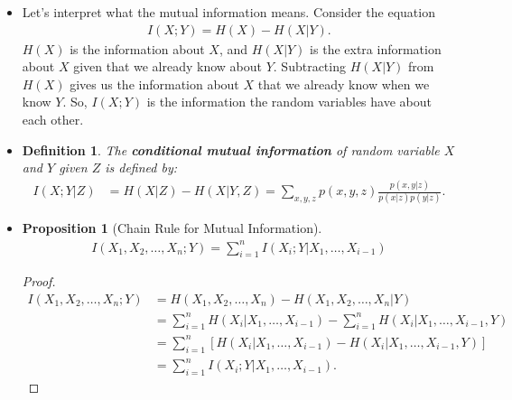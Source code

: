 \documentclass[10pt]{article}
\newtheorem{definition}[lemma]{Definition}
\newtheorem{proposition}[lemma]{Proposition}
\begin{document}
\begin{itemize}
 	\begin{proof}
 		\begin{align*}
 			I(X;Y)
	 		&= \sum_x \sum_y p(x,y) \log \frac{p(x,y)}{p(x)p(y)} \\
	 		&= \sum_x \sum_y p(x,y) \log \frac{p(x|y)}{p(x)} \\
	 		&= \sum_x \sum_y p(x,y) \log \frac{1}{p(x)}
	 		   - \sum_x \sum_y p(x,y) \log \frac{1}{p(x|y)} \\
	 		&= \sum_x p(x) \log \frac{1}{p(x)}
	 		   - \sum_y p(y) \bigg( \sum_x  p(x|y) \log \frac{1}{p(x|y)} \bigg) \\
	 		&= H(X) - H(X|Y).
 		\end{align*}
 		The equation $I(X;Y) = H(Y) - H(Y|X)$ can be proved similarly. Now, we have that:
 		\begin{align*}
 			I(X,Y) 
 			= H(X) - H(X|Y)
 			= H(X) - [H(X,Y) - H(Y)]
 			= H(X) + H(Y) - H(X,Y).
 		\end{align*}
 	\end{proof}

 	\item Let's interpret what the mutual information means. Consider the equation
 	\begin{align*}
 		I(X;Y) = H(X) - H(X|Y).
 	\end{align*}
 	$H(X)$ is the information about $X$, and $H(X|Y)$ is the extra information about $X$ given that we already know about $Y$. Subtracting $H(X|Y)$ from $H(X)$ gives us the information about $X$ that we already know when we know $Y$. So, $I(X;Y)$ is the information the random variables have about each other.

 	\item \begin{definition}
 		The \textbf{conditional mutual information} of random variable $X$ and $Y$ given $Z$ is defined by:
 		\begin{align*}
 			I(X;Y|Z) 
 			&= H(X|Z) - H(X|Y,Z)
 			= \sum_{x,y,z} p(x,y,z) \frac{p(x,y|z)}{p(x|z)p(y|z)}.
 		\end{align*}
 	\end{definition}

 	\item \begin{proposition}[Chain Rule for Mutual Information]
 		\begin{align*}
 		I(X_1,X_2,\dotsc,X_n;Y) = \sum_{i=1}^n I(X_i;Y|X_1, \dotsc, X_{i-1})
 		\end{align*}
 	\end{proposition}
 	\begin{proof}
 		\begin{align*}
 			I(X_1,X_2,\dotsc,X_n;Y)
 			&= H(X_1,X_2,\dotsc,X_n) - H(X_1,X_2,\dotsc,X_n|Y) \\
 			&= \sum_{i=1}^n H(X_i|X_1, \dotsc, X_{i-1})
 			- \sum_{i=1}^n H(X_i|X_1, \dotsc, X_{i-1},Y) \\
 			&= \sum_{i=1}^n [ H(X_i|X_1, \dotsc, X_{i-1})
 			- H(X_i|X_1, \dotsc, X_{i-1},Y) ] \\
 			&= \sum_{i=1}^n I(X_i;Y|X_1, \dotsc, X_{i-1}).
 		\end{align*}
 	\end{proof}


\end{itemize}
\end{document}
